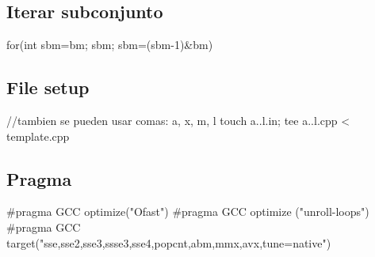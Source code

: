 \subsection*{Iterar subconjunto}
\begin{code}
for(int sbm=bm; sbm; sbm=(sbm-1)&bm)
\end{code}
\subsection*{File setup}
\begin{code}
//tambien se pueden usar comas: {a, x, m, l}
touch {a..l}.in; tee {a..l}.cpp < template.cpp
\end{code}

\subsection*{Pragma}
\begin{code}
#pragma GCC optimize("Ofast")
#pragma GCC optimize ("unroll-loops")
#pragma GCC target("sse,sse2,sse3,ssse3,sse4,popcnt,abm,mmx,avx,tune=native")\end{code}



